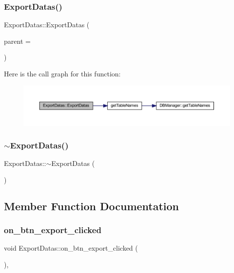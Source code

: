 \subsubsection{\texorpdfstring{ExportDatas()}{ExportDatas()}}
{\footnotesize\ttfamily Export\+Datas\+::\+Export\+Datas (\begin{DoxyParamCaption}\item[{Q\+Widget $\ast$}]{parent = {} }\end{DoxyParamCaption})\hspace{0.3cm}{\ttfamily [explicit]}}

Here is the call graph for this function\+:
\nopagebreak
\begin{figure}[H]
\begin{center}
\leavevmode
\includegraphics[width=350pt]{class_export_datas_ac10b5c403c931f0c3e78affc26176f41_cgraph}
\end{center}
\end{figure}
\mbox{\label{class_export_datas_ae221d807f785991c912976696581979f}} 
\subsubsection{\texorpdfstring{$\sim$ExportDatas()}{~ExportDatas()}}
{\footnotesize\ttfamily Export\+Datas\+::$\sim$\+Export\+Datas (\begin{DoxyParamCaption}{ }\end{DoxyParamCaption})}



\subsection{Member Function Documentation}
\mbox{\label{class_export_datas_a937c315ff3df44fa7693741cc9f046a4}} 
\subsubsection{\texorpdfstring{on\_btn\_export\_clicked}{on\_btn\_export\_clicked}}
{\footnotesize\ttfamily void Export\+Datas\+::on\+\_\+btn\+\_\+export\+\_\+clicked (\begin{DoxyParamCaption}{ }\end{DoxyParamCaption})\hspace{0.3cm}{\ttfamily [private]}, {\ttfamily [slot]}}



